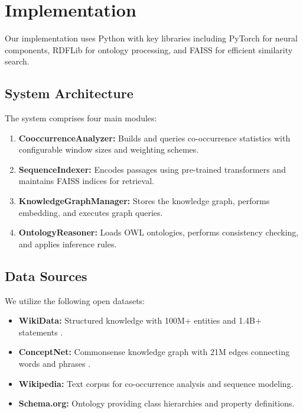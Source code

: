 \documentclass[conference]{IEEEtran}
\begin{document}
\section{Implementation}

Our implementation uses Python with key libraries including PyTorch for neural components, RDFLib for ontology processing, and FAISS for efficient similarity search.

\subsection{System Architecture}

The system comprises four main modules:

\begin{enumerate}
    \item \textbf{CooccurrenceAnalyzer:} Builds and queries co-occurrence statistics with configurable window sizes and weighting schemes.
    
    \item \textbf{SequenceIndexer:} Encodes passages using pre-trained transformers and maintains FAISS indices for retrieval.
    
    \item \textbf{KnowledgeGraphManager:} Stores the knowledge graph, performs embedding, and executes graph queries.
    
    \item \textbf{OntologyReasoner:} Loads OWL ontologies, performs consistency checking, and applies inference rules.
\end{enumerate}

\subsection{Data Sources}

We utilize the following open datasets:

\begin{itemize}
    \item \textbf{WikiData:} Structured knowledge with 100M+ entities and 1.4B+ statements \cite{vrandecic2014wikidata}.
    
    \item \textbf{ConceptNet:} Commonsense knowledge graph with 21M edges connecting words and phrases \cite{speer2017conceptnet}.
    
    \item \textbf{Wikipedia:} Text corpus for co-occurrence analysis and sequence modeling.
    
    \item \textbf{Schema.org:} Ontology providing class hierarchies and property definitions.
\end{itemize}
\end{document}
